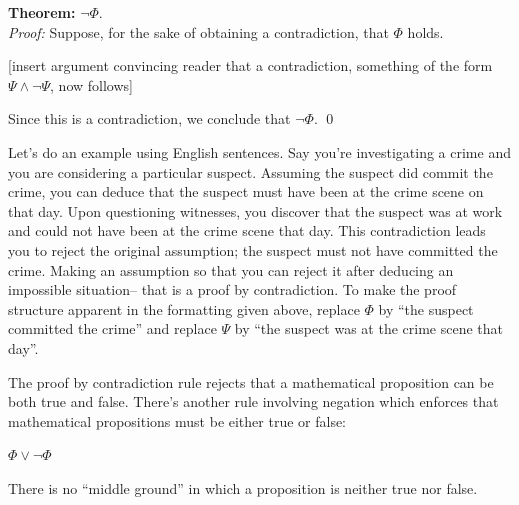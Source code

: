 \documentclass[12pt]{article}
\newcommand{\AND}{\wedge}
\newcommand{\OR}{\vee}
\newcounter{exercise}[subsubsection]
\newcounter{rule}
\def\putRuleNumber{\refstepcounter{rule}\therule}
\newcommand{\indented}[1]{\begin{adjustwidth}{1em}{}#1\end{adjustwidth}}
\newcommand{\THM}[2]{\textbf{Theorem:} #1\\[0.5em]\textit{Proof:} #2\qed}
\newcommand{\RULE}[2]{\begin{tcolorbox}[title=Rule \putRuleNumber: #1,colbacktitle=white,coltitle=black,colback=white]#2\end{tcolorbox}}
\def\pA{\Phi}
\def\pB{\Psi}
\begin{document}
\THM{$\neg\pA$.}{
Suppose, for the sake of obtaining a contradiction, that $\pA$ holds.
\indented{[insert argument convincing reader that a contradiction, something of the form $\pB\AND\neg\pB$, now follows]}
Since this is a contradiction, we conclude that $\neg\pA$.
}

Let's do an example using English sentences.
Say you're investigating a crime and you are considering a particular suspect.
Assuming the suspect did commit the crime, you can deduce that the suspect must have been at the crime scene on that day.
Upon questioning witnesses, you discover that the suspect was at work and could not have been at the crime scene that day.
This contradiction leads you to reject the original assumption; the suspect must not have committed the crime.
Making an assumption so that you can reject it after deducing an impossible situation-- that is a proof by contradiction.
To make the proof structure apparent in
the formatting given above, replace
$\pA$ by ``the suspect committed the crime'' and replace $\pB$ by ``the suspect was at the crime scene that day''.


The proof by contradiction rule rejects that a mathematical proposition can be both true and false.
There's
another rule involving negation which
enforces that mathematical propositions must be either true or false:
\RULE{Excluded middle}{
$\pA\OR\neg\pA$
}
There is no ``middle ground'' in which a proposition is neither true nor false.











\end{document}
